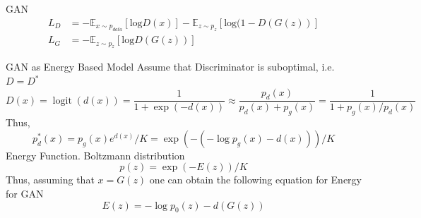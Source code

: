 \documentclass[xcolor=dvipsnames]{beamer}
\begin{document}
    \begin{frame}
        \titlepage
    \end{frame}

    \begin{frame}{GAN}
        \begin{align*}
            L_D &= -\mathbb{E}_{x \sim p_{data}} [ \text{log} D(x)] - \mathbb{E}_{z \sim p_z} [\text{log}(1 - D(G(z))] \\    
            L_G &= -\mathbb{E}_{z \sim p_z} [\text{log} D(G(z))]
        \end{align*}
    \end{frame}

    \begin{frame}{GAN as Energy Based Model}
        Assume that Discriminator is suboptimal, i.e. $D = D^*$
        \begin{equation*}
            D(x) = \operatorname*{logit}(d(x)) = \frac{1}{1 + \exp(-d(x))} \approx \frac{p_d(x)}{p_d(x) + p_g(x)}  = \frac{1}{1 + p_g(x)/p_d(x)}
        \end{equation*}
        Thus,
        \begin{equation*}
                p_d^*(x) = p_g(x) e^{d(x)} / K = \exp\left( - (-\log p_g(x) - d(x))\right) / K
        \end{equation*}
        Energy Function. Boltzmann distribution
        \begin{equation*}
            p(z) = \exp(-E(z)) / K 
        \end{equation*}
        Thus, assuming that $x = G(z)$ one can obtain the following equation for Energy for GAN
        \begin{equation*}
            E(z) = -\log p_0(z) - d(G(z))
        \end{equation*}
    \end{frame}
\end{document}
